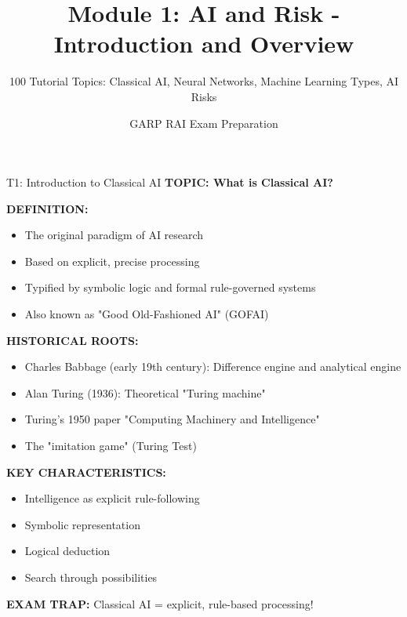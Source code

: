 \documentclass[8pt]{beamer}
\title{Module 1: AI and Risk - Introduction and Overview}
\subtitle{100 Tutorial Topics: Classical AI, Neural Networks, Machine Learning Types, AI Risks}
\author{GARP RAI Exam Preparation}
\date{}
\begin{document}
	
	\begin{frame}
		\titlepage
	\end{frame}
	
	
	\begin{frame}{T1: Introduction to Classical AI}
		\fontsize{6.5}{7.5}\selectfont
		\textbf{TOPIC: What is Classical AI?}
		
		\vspace{0.1cm}
		\textbf{DEFINITION:}
		\begin{itemize}
			\item The original paradigm of AI research
			\item Based on explicit, precise processing
			\item Typified by symbolic logic and formal rule-governed systems
			\item Also known as "Good Old-Fashioned AI" (GOFAI)
		\end{itemize}
		
		\vspace{0.1cm}
		\textbf{HISTORICAL ROOTS:}
		\begin{itemize}
			\item Charles Babbage (early 19th century): Difference engine and analytical engine
			\item Alan Turing (1936): Theoretical "Turing machine"
			\item Turing's 1950 paper "Computing Machinery and Intelligence"
			\item The "imitation game" (Turing Test)
		\end{itemize}
		
		\vspace{0.1cm}
		\textbf{KEY CHARACTERISTICS:}
		\begin{itemize}
			\item Intelligence as explicit rule-following
			\item Symbolic representation
			\item Logical deduction
			\item Search through possibilities
		\end{itemize}
		
		\textcolor{myred}{\textbf{EXAM TRAP:}} Classical AI = \textcolor{myblue}{explicit, rule-based processing}!
	\end{frame}
	
\end{document}
